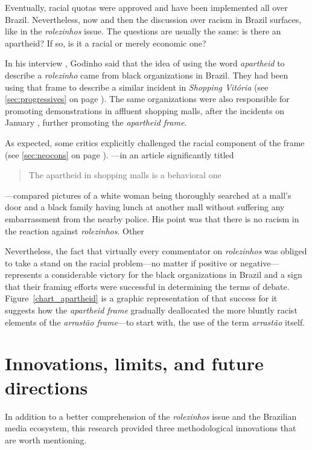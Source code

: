 Eventually, racial quotas were approved and have been implemented all over Brazil. Nevertheless, now and then the discussion over racism in Brazil surfaces, like in the \emph{rolezinhos} issue. The questions are usually the same: is there an apartheid? If so, is it a racial or merely economic one?

In his interview \autocite{interview_godinho}, Godinho said that the idea of using the word \emph{apartheid} to describe a \emph{rolezinho} came from black organizations in Brazil. They had been using that frame to describe a similar incident in \emph{Shopping Vitória} (see \autoref{sec:progressives}  on page \pageref{sec:progressives}). The same organizations were also responsible for promoting demonstrations in affluent shopping malls, after the incidents on January , further promoting the \emph{apartheid frame}.

As expected, some critics explicitly challenged the racial component of the frame (see \autoref{sec:neocons}  on page \pageref{sec:neocons}). \citeauthor{constantino_comportamental}---in an article significantly titled \blockcquote{constantino_comportamental}{The apartheid in shopping malls is a behavioral one}---compared pictures of a white woman being thoroughly searched at a mall's door and a black family having lunch at another mall without suffering any embarrassment from the nearby police. His point was that there is no racism in the reaction against \emph{rolezinhos}. Other 

Nevertheless, the fact that virtually every commentator on \emph{rolezinhos} was obliged to take a stand on the racial problem---no matter if positive or negative---represents a considerable victory for the black organizations in Brazil and a sign that their framing efforts were successful in determining the terms of debate. Figure~\ref{chart_apartheid} is a graphic representation of that success for it suggests how the \emph{apartheid frame} gradually deallocated the more bluntly racist elements of the \emph{arrastão frame}---to start with, the use of the term \emph{arrastão} itself.

\section{Innovations, limits, and future directions}

In addition to a better comprehension of the \emph{rolezinhos} issue and the Brazilian media ecosystem, this research provided three methodological innovations that are worth mentioning.


